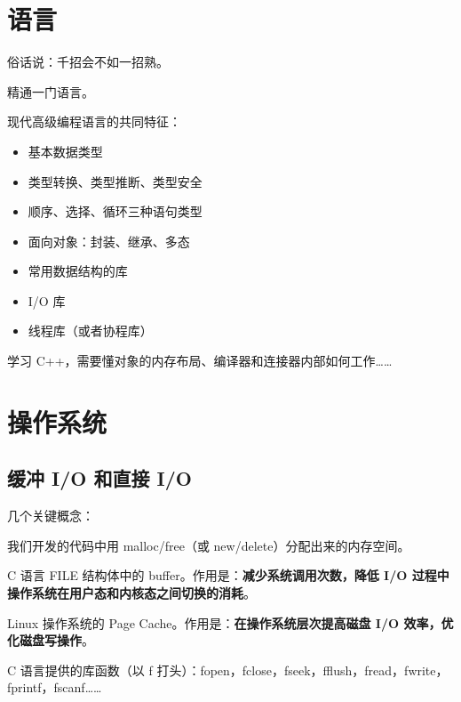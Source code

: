 \documentclass[cn,normal,12pt]{../elegantnote}
\begin{document}
\section{语言}
俗话说：千招会不如一招熟。

精通一门语言。

现代高级编程语言的共同特征：
\begin{itemize}
   \item 基本数据类型
   \item 类型转换、类型推断、类型安全
   \item 顺序、选择、循环三种语句类型
   \item 面向对象：封装、继承、多态
   \item 常用数据结构的库
   \item I/O 库
   \item 线程库（或者协程库）
\end{itemize}

\begin{note}
学习 C++，需要懂对象的内存布局、编译器和连接器内部如何工作……
\end{note}

\section{操作系统}

\subsection{缓冲 I/O 和直接 I/O}
几个关键概念：
\begin{definition}[应用程序内存]
   我们开发的代码中用 malloc/free（或 new/delete）分配出来的内存空间。
\end{definition}
\begin{definition}[用户缓冲区]
   C 语言 FILE 结构体中的 buffer。作用是：\textbf{减少系统调用次数，降低 I/O 过程中操作系统在用户态和内核态之间切换的消耗}。
\end{definition}
\begin{definition}[内核缓冲区]
   Linux 操作系统的 Page Cache。作用是：\textbf{在操作系统层次提高磁盘 I/O 效率，优化磁盘写操作}。
\end{definition}
\begin{definition}[缓冲 I/O]
   C 语言提供的库函数（以 f 打头）：fopen，fclose，fseek，fflush，fread，fwrite，fprintf，fscanf……
\end{definition}
\end{document}
